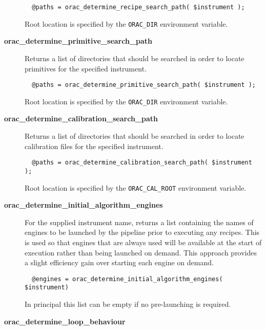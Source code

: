 \begin{description}
\begin{verbatim}
  @paths = orac_determine_recipe_search_path( $instrument );
\end{verbatim}


Root location is specified by the \texttt{ORAC\_DIR} environment
variable.


\item[\textbf{orac\_determine\_primitive\_search\_path}] \mbox{}

Returns a list of directories that should be searched in order
to locate primitives for the specified instrument.

\begin{verbatim}
  @paths = orac_determine_primitive_search_path( $instrument );
\end{verbatim}


Root location is specified by the \texttt{ORAC\_DIR} environment
variable.


\item[\textbf{orac\_determine\_calibration\_search\_path}] \mbox{}

Returns a list of directories that should be searched in order
to locate calibration files for the specified instrument.

\begin{verbatim}
  @paths = orac_determine_calibration_search_path( $instrument );
\end{verbatim}


Root location is specified by the \texttt{ORAC\_CAL\_ROOT} environment
variable.


\item[\textbf{orac\_determine\_initial\_algorithm\_engines}] \mbox{}

For the supplied instrument name, returns a list containing the names
of engines to be launched by the pipeline prior to executing any
recipes. This is used so that engines that are always used will be
available at the start of execution rather than being launched on
demand. This approach provides a slight efficiency gain over starting
each engine on demand.

\begin{verbatim}
  @engines = orac_determine_initial_algorithm_engines( $instrument)
\end{verbatim}


In principal this list can be empty if no pre-launching is required.


\item[\textbf{orac\_determine\_loop\_behaviour}] \mbox{}


\end{description}
